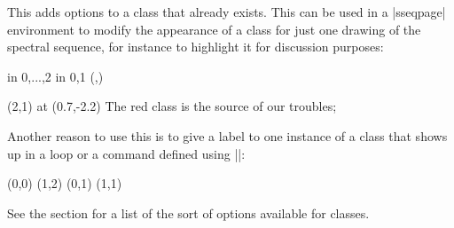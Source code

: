 \documentclass{ltxdoc}
\begin{document}
\begin{sseqdata}[name=ex1,degree={#1}{1-#1}]
\begin{command}{}
This adds options to a class that already exists. This can be used in a |sseqpage| environment to modify the appearance of a class for just one drawing of the spectral sequence, for instance to highlight it for discussion purposes:
\begin{codeexample}[width=5cm]
\begin{sseqdata}[name=class options example,classes=fill]
\foreach \x in {0,...,2} \foreach \y in {0,1}{
    \class(\x,\y)
}
\end{sseqdata}
\begin{sseqpage}[name=class options example]
\classoptions[red](2,1) %
\node[background,text width=10em] at (0.7,-2.2)
    {\textup{The red class is the source of our troubles}};
\end{sseqpage}
\end{codeexample}
Another reason to use this is to give a label to one instance of a class that shows up in a loop or a command defined using |\sseqnewgroup|:
\begin{codeexample}[width=6cm]
\sseqnewgroup{}
\begin{sseqpage}[classes=fill,class labels={left=0.3em},math nodes]
\mygroup(0,0)
\mygroup(1,2)
\classoptions["2"](0,1)
\classoptions["\eta"](1,1)
\end{sseqpage}
\end{codeexample}
See the  section for a list of the sort of options available for classes.
\end{command}


\end{sseqdata}
\end{document}
